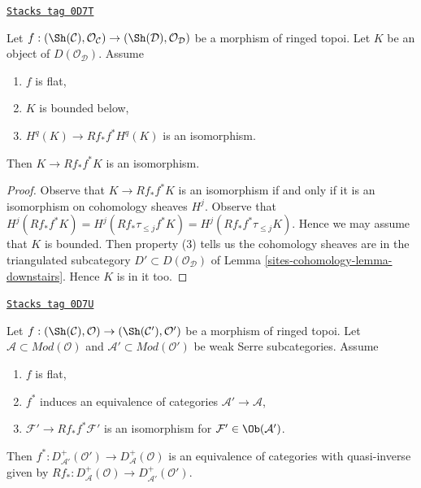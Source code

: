 \begin{lemma}
\label{sites-cohomology-lemma-bounded-in-image-downstairs}
\href{https://stacks.math.columbia.edu/tag/0D7T}{\texttt{Stacks tag 0D7T}}

Let $f : (\Sh(\mathcal{C}), \mathcal{O}_\mathcal{C}) \to
(\Sh(\mathcal{D}), \mathcal{O}_\mathcal{D})$ be a morphism of ringed topoi.
Let $K$ be an object of $D(\mathcal{O}_\mathcal{D})$. Assume
\begin{enumerate}
\item $f$ is flat,
\item $K$ is bounded below,
\item $H^q(K) \to Rf_*f^*H^q(K)$ is an isomorphism.
\end{enumerate}
Then $K \to Rf_*f^*K$ is an isomorphism.
\end{lemma}

\begin{proof}
Observe that $K \to Rf_*f^*K$ is an isomorphism if and only
if it is an isomorphism on cohomology sheaves $H^j$. Observe that
$H^j(Rf_*f^*K) = H^j(Rf_*\tau_{\leq j}f^*K) = H^j(Rf_*f^*\tau_{\leq j}K)$.
Hence we may assume that $K$ is bounded. Then property (3)
tells us the cohomology sheaves are in the triangulated
subcategory $D' \subset D(\mathcal{O}_\mathcal{D})$ of
Lemma \ref{sites-cohomology-lemma-downstairs}. Hence $K$ is in it too.
\end{proof}

\begin{lemma}
\label{sites-cohomology-lemma-equivalence-bounded}
\href{https://stacks.math.columbia.edu/tag/0D7U}{\texttt{Stacks tag 0D7U}}

Let $f : (\Sh(\mathcal{C}), \mathcal{O}) \to (\Sh(\mathcal{C}'), \mathcal{O}')$
be a morphism of ringed topoi.
Let $\mathcal{A} \subset \textit{Mod}(\mathcal{O})$
and $\mathcal{A}' \subset \textit{Mod}(\mathcal{O}')$
be weak Serre subcategories. Assume
\begin{enumerate}
\item $f$ is flat,
\item $f^*$ induces an equivalence of categories
$\mathcal{A}' \to \mathcal{A}$,
\item $\mathcal{F}' \to Rf_*f^*\mathcal{F}'$ is an isomorphism
for $\mathcal{F}' \in \Ob(\mathcal{A}')$.
\end{enumerate}
Then
$f^* : D_{\mathcal{A}'}^+(\mathcal{O}') \to D_\mathcal{A}^+(\mathcal{O})$
is an equivalence of categories with quasi-inverse given by
$Rf_* : D_\mathcal{A}^+(\mathcal{O}) \to D_{\mathcal{A}'}^+(\mathcal{O}')$.
\end{lemma}

